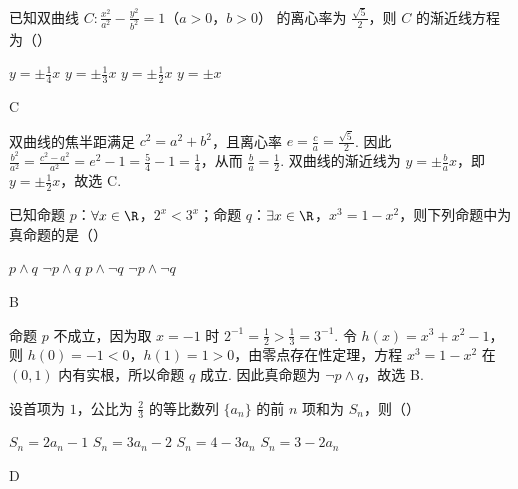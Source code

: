 \begin{problem}
已知双曲线 \(C: \frac{x^2}{a^2} - \frac{y^2}{b^2} = 1\)（\(a > 0\)，\(b > 0\)） 的离心率为 \(\frac{\sqrt{5}}{2}\)，则 \(C\) 的渐近线方程为（\quad）

\choices
    {\(y = \pm \frac{1}{4} x\)}
    {\(y = \pm \frac{1}{3} x\)}
    {\(y = \pm \frac{1}{2} x\)}
    {\(y = \pm x\)}
\end{problem}

\begin{answer}
C
\end{answer}

\begin{solution}
双曲线的焦半距满足 \(c^2=a^2+b^2\)，且离心率 \(e=\frac{c}{a}=\frac{\sqrt{5}}{2}\). 因此
\(\displaystyle\frac{b^2}{a^2}=\frac{c^2-a^2}{a^2}=e^2-1=\frac{5}{4}-1=\frac{1}{4}\)，从而 \(\frac{b}{a}=\frac{1}{2}\). 双曲线的渐近线为 \(y=\pm\frac{b}{a}x\)，即 \(y=\pm\frac{1}{2}x\)，故选 C.
\end{solution}

\begin{problem}
已知命题 \(p\)：\(\forall x \in \R\)，\(2^x < 3^x\)；命题 \(q\)：\(\exists x \in \R\)，\(x^3 = 1 - x^2\)，则下列命题中为真命题的是（\quad）

\choices
    {\(p \wedge q\)}
    {\(\neg p \land q\)}
    {\(p \wedge \neg q\)}
    {\(\neg p \land \neg q\)}
\end{problem}

\begin{answer}
B
\end{answer}

\begin{solution}
命题 \(p\) 不成立，因为取 \(x=-1\) 时 \(2^{-1}=\frac{1}{2}>\frac{1}{3}=3^{-1}\). 令 \(h(x)=x^3+x^2-1\)，则 \(h(0)=-1<0\)，\(h(1)=1>0\)，由零点存在性定理，方程 \(x^3=1-x^2\) 在 \((0,1)\) 内有实根，所以命题 \(q\) 成立. 因此真命题为 \(\neg p\wedge q\)，故选 B.
\end{solution}

\begin{problem}
设首项为 \(1\)，公比为 \(\frac{2}{3}\) 的等比数列 \(\{a_n\}\) 的前 \(n\) 项和为 \(S_n\)，则（\quad）

\choices
    {\(S_{n} = 2a_{n} - 1\)}
    {\(S_{n} = 3a_{n} - 2\)}
    {\(S_{n} = 4 - 3a_{n}\)}
    {\(S_{n} = 3 - 2a_{n}\)}
\end{problem}

\begin{answer}
D
\end{answer}

